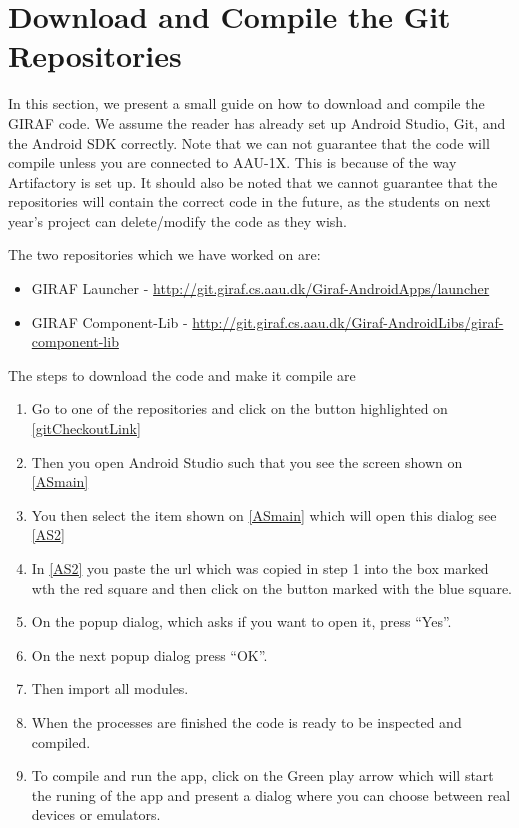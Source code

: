\section{Download and Compile the Git Repositories}
In this section, we present a small guide on how to download and compile the
GIRAF code. We assume the reader has already set up Android Studio, Git, and the
Android SDK correctly. Note that we can not guarantee that the code will compile
unless you are connected to AAU-1X. This is because of the way Artifactory is
set up. It should also be noted that we cannot guarantee that the
repositories will contain the correct code in the future, as the students on
next year's project can delete/modify the code as they wish.\nl

The two repositories which we have worked on are:

\begin{itemize}
  \item GIRAF Launcher -
  \url{http://git.giraf.cs.aau.dk/Giraf-AndroidApps/launcher}
  \item GIRAF Component-Lib -
  \url{http://git.giraf.cs.aau.dk/Giraf-AndroidLibs/giraf-component-lib}
\end{itemize}

The steps to download the code and make it compile are
\begin{enumerate}
  \item Go to one of the repositories and click on the button highlighted on
  \autoref{gitCheckoutLink}
  \item Then you open Android Studio such that you see the screen shown on
  \autoref{ASmain}
  \item You then select the item shown on \autoref{ASmain} which will open this
  dialog see \autoref{AS2}
  \item In \autoref{AS2} you paste the url which was copied
  in step 1 into the box marked wth the red square and then click on the button
  marked with the blue square. 
  \item On the popup dialog, which asks if you want to open it, press ``Yes''.
  \item On the next popup dialog press ``OK''.
  \item Then import all modules.
  \item When the processes are finished the code is ready to be inspected
  and compiled.
  \item To compile and run the app, click on the Green play arrow which
  will start the runing of the app and present a dialog where you can choose
  between real devices or emulators.
\end{enumerate}





